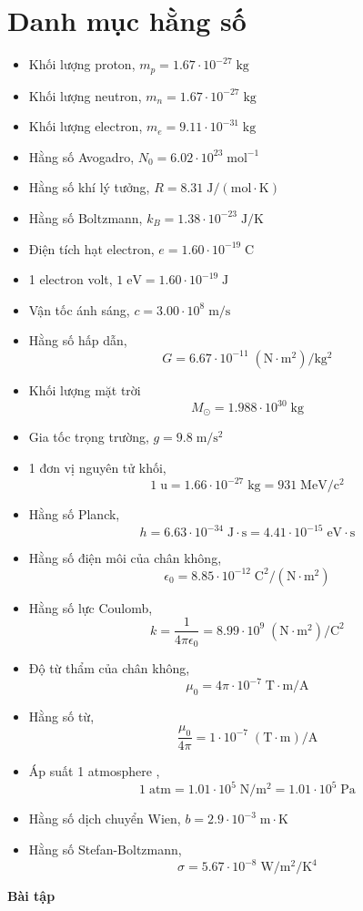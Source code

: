 \documentclass[11pt]{article}
\begin{document}
\section*{Danh mục hằng số}
\begin{multicols}{2}
\begin{itemize}
    \item Khối lượng proton, $m_p = 1.67\cdot 10^{-27}\;\mathrm{kg}$
    \item Khối lượng neutron, $m_n = 1.67 \cdot 10^{-27}\;\mathrm{kg}$
    \item Khối lượng electron, $m_e = 9.11 \cdot 10^{-31}\;\mathrm{kg}$
    \item Hằng số Avogadro, $N_0 = 6.02 \cdot 10^{23}\;\mathrm{mol^{-1}}$
    \item Hằng số khí lý tưởng, $R = 8.31\;\mathrm{J/(mol\cdot K)}$
    \item Hằng số Boltzmann, $k_B = 1.38\cdot 10^{-23}\;\mathrm{J/K}$
    \item Điện tích hạt electron, $e = 1.60 \cdot 10^{-19}\;\mathrm{C}$
    \item 1 electron volt, $1\;\mathrm{eV} = 1.60\cdot 10^{-19}\;\mathrm{J}$
    \item Vận tốc ánh sáng, $c = 3.00 \cdot 10^8\;\mathrm{m/s}$
    \item Hằng số hấp dẫn, \[G = 6.67\cdot 10^{-11}\;\mathrm{(N\cdot m^2)/kg^2}\]
    \item Khối lượng mặt trời
    \[M_{\odot} = 1.988\cdot 10^{30}\;\mathrm{kg}\]
    \item Gia tốc trọng trường, $g = 9.8\;\mathrm{m/s^2}$
    \item 1 đơn vị nguyên tử khối, \[1\;\mathrm{u} = 1.66 \cdot 10^{-27}\;\mathrm{kg} = 931\;\mathrm{MeV/c^2}\]
    \item Hằng số Planck, 
        \[h = 6.63 \cdot 10^{-34}\;\mathrm{J\cdot s} = 4.41\cdot 10^{-15}\;\mathrm{eV\cdot s}\]
    \item Hằng số điện môi của chân không, \[\epsilon_0 = 8.85 \cdot 10^{-12}\;\mathrm{C^2/(N\cdot m^2)}\]
    \item Hằng số lực Coulomb,
    \[k = \frac{1}{4\pi\epsilon_0} = 8.99 \cdot 10^9\;\mathrm{(N\cdot m^2)/C^2}\]
    \item Độ từ thẩm của chân không, \[\mu_0 = 4\pi\cdot 10^{-7}\;\mathrm{T\cdot m/A}\]
    \item Hằng số từ, 
    \[ \frac{\mu_0}{4\pi} = 1\cdot 10^{-7}\;\mathrm{(T\cdot m)/A}\]
    \item Áp suất 1 atmosphere ,
    \[1\;\mathrm{atm} = 1.01 \cdot 10^5\;\mathrm{N/m^2} = 1.01\cdot 10^5\;\mathrm{Pa}\]
    \item Hằng số dịch chuyển Wien, $b = 2.9\cdot 10^{-3}\;\mathrm{m\cdot K}$
    \item Hằng số Stefan-Boltzmann, \[\sigma = 5.67\cdot 10^{-8}\;\mathrm{W/m^2/K^4}\]
\end{itemize}
\end{multicols}
\newpage
\normalsize
\begin{center}
    \Large 
    \textbf{Bài tập}
\end{center}
\end{document}
